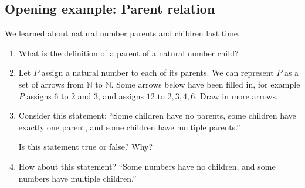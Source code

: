\documentclass[11pt]{article}
\newenvironment{task}
	{\begin{mdframed}[linecolor=lightgray, linewidth=3pt]\raggedright}
	{\end{mdframed}}
\newcommand{\N}{\mathbb{N}}
\theoremstyle{definition}
\begin{document}


\subsection{Opening example: Parent relation}

\begin{task}
We learned about natural number parents and children last time.

\begin{enumerate}
\item What is the definition of a parent of a natural number child? 
\item 
Let $P$ assign a natural number to each of its parents. We can represent $P$ as a set of arrows from $\N$ to $\N$.  Some arrows below have been filled in, for example $P$ assigns $6$ to $2$ and $3$, and assigns $12$ to $2, 3, 4, 6$.  Draw in more arrows.

\item Consider this statement: ``Some children have no parents, some children have exactly one parent, and some children have multiple parents.''  

Is this statement true or false? Why?

\item How about this statement? ``Some numbers have no children, and some numbers have multiple children.'' 
\end{enumerate}

\vfill
\begin{center}
\end{center}
\end{task}
\end{document}
